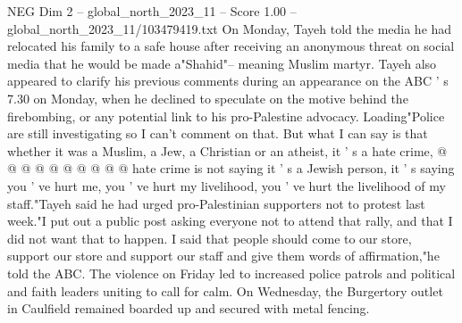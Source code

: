 \begin{textsample}{NEG Dim 2 – global\_north\_2023\_11 – Score 1.00 – global\_north\_2023\_11/103479419.txt}
On Monday, Tayeh told the media he had relocated his family to a safe house after receiving an anonymous threat on social media that he would be made a"Shahid"-- meaning Muslim martyr.
Tayeh also appeared to clarify his previous comments during an appearance on the ABC ' s 7.30 on Monday, when he declined to speculate on the motive behind the firebombing, or any potential link to his pro-Palestine advocacy.
Loading"Police are still investigating so I can't comment on that.
But what I can say is that whether it was a Muslim, a Jew, a Christian or an atheist, it ' s a hate crime, @ @ @ @ @ @ @ @ @ @ hate crime is not saying it ' s a Jewish person, it ' s saying you ' ve hurt me, you ' ve hurt my livelihood, you ' ve hurt the livelihood of my staff."Tayeh said he had urged pro-Palestinian supporters not to protest last week."I put out a public post asking everyone not to attend that rally, and that I did not want that to happen.
I said that people should come to our store, support our store and support our staff and give them words of affirmation,"he told the ABC.
The violence on Friday led to increased police patrols and political and faith leaders uniting to call for calm.
On Wednesday, the Burgertory outlet in Caulfield remained boarded up and secured with metal fencing.

\end{textsample}
